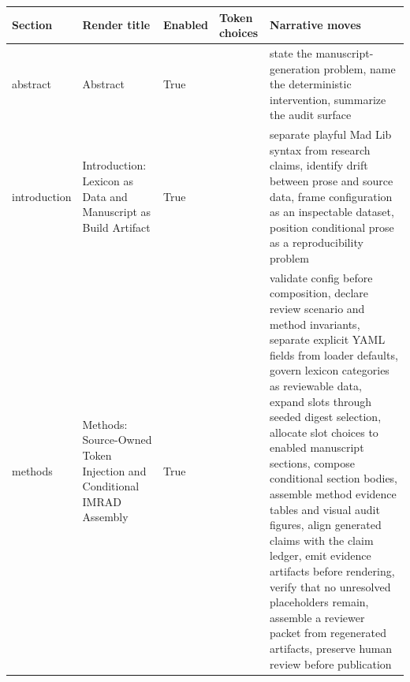 \documentclass[
  english,
]{article}
\newcounter{none} %
\begin{document}
{\def\LTcaptype{none} %
\begin{longtable}[]{@{}
  >{\raggedright\arraybackslash}p{}
  >{\raggedright\arraybackslash}p{}
  >{\raggedleft\arraybackslash}p{}
  >{\raggedleft\arraybackslash}p{}
  >{\raggedright\arraybackslash}p{}@{}}
\toprule\noalign{}
\begin{minipage}[b]{\linewidth}\raggedright
Section
\end{minipage} & \begin{minipage}[b]{\linewidth}\raggedright
Render title
\end{minipage} & \begin{minipage}[b]{\linewidth}\raggedleft
Enabled
\end{minipage} & \begin{minipage}[b]{\linewidth}\raggedleft
Token choices
\end{minipage} & \begin{minipage}[b]{\linewidth}\raggedright
Narrative moves
\end{minipage} \\
\midrule\noalign{}
\endhead
\bottomrule\noalign{}
\endlastfoot
abstract & Abstract & True & 3 & state the manuscript-generation
problem, name the deterministic intervention, summarize the audit
surface \\
introduction & Introduction: Lexicon as Data and Manuscript as Build
Artifact & True & 8 & separate playful Mad Lib syntax from research
claims, identify drift between prose and source data, frame
configuration as an inspectable dataset, position conditional prose as a
reproducibility problem \\
methods & Methods: Source-Owned Token Injection and Conditional IMRAD
Assembly & True & 6 & validate config before composition, declare review
scenario and method invariants, separate explicit YAML fields from
loader defaults, govern lexicon categories as reviewable data, expand
slots through seeded digest selection, allocate slot choices to enabled
manuscript sections, compose conditional section bodies, assemble method
evidence tables and visual audit figures, align generated claims with
the claim ledger, emit evidence artifacts before rendering, verify that
no unresolved placeholders remain, assemble a reviewer packet from
regenerated artifacts, preserve human review before publication

\end{longtable}}
\end{document}

